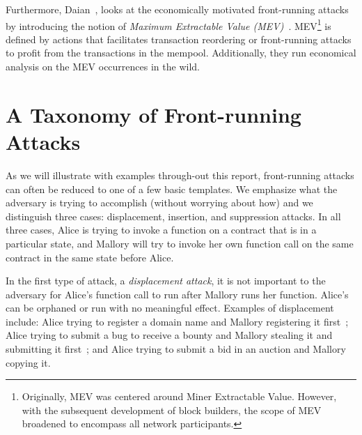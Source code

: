 Furthermore, Daian~\etal, looks at the economically motivated front-running attacks by introducing the notion of \textit{Maximum Extractable Value (MEV)}~\cite{daian2019flash}. MEV\footnote{Originally, MEV was centered around Miner Extractable Value. However, with the subsequent development of block builders, the scope of MEV broadened to encompass all network participants.} is defined by actions that facilitates transaction reordering or front-running attacks to profit from the transactions in the mempool. Additionally, they run economical analysis on the MEV occurrences in the wild. 












\section{A Taxonomy of Front-running Attacks}
\label{sec:taxonomy}

As we will illustrate with examples through-out this report, front-running attacks can often be reduced to one of a few basic templates. We emphasize what the adversary is trying to accomplish (without worrying about how) and we distinguish three cases: displacement, insertion, and suppression attacks. In all three cases, Alice is trying to invoke a function on a contract that is in a particular state, and Mallory will try to invoke her own function call on the same contract in the same state before Alice.

In the first type of attack, a \textit{displacement attack}, it is not important to the adversary for Alice's function call to run after Mallory runs her function. Alice's can be orphaned or run with no meaningful effect. Examples of displacement include: Alice trying to register a domain name and Mallory registering it first~\cite{kalodner2015empirical}; Alice trying to submit a bug to receive a bounty and Mallory stealing it and submitting it first~\cite{breidenbach2018enter}; and Alice trying to submit a bid in an auction and Mallory copying it. 

